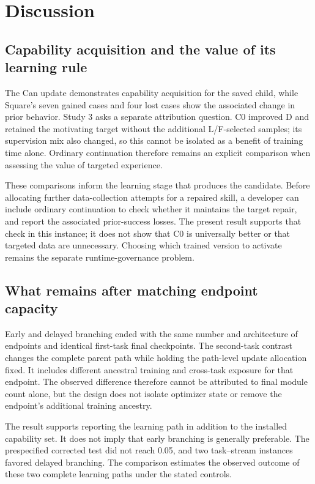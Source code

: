 \documentclass[10pt,letterpaper]{article}
\begin{document}
\section{Discussion}\label{discussion}

\subsection{Capability acquisition and the value of its learning
rule}\label{capability-acquisition-and-the-value-of-its-learning-rule}

The Can update demonstrates capability acquisition for the saved child,
while Square's seven gained cases and four lost cases show the
associated change in prior behavior. Study 3 asks a separate attribution
question. C0 improved D and retained the motivating target without the
additional L/F-selected samples; its supervision mix also changed, so
this cannot be isolated as a benefit of training time alone. Ordinary
continuation therefore remains an explicit comparison when assessing the
value of targeted experience.

These comparisons inform the learning stage that produces the candidate.
Before allocating further data-collection attempts for a repaired skill,
a developer can include ordinary continuation to check whether it
maintains the target repair, and report the associated prior-success
losses. The present result supports that check in this instance; it does
not show that C0 is universally better or that targeted data are
unnecessary. Choosing which trained version to activate remains the
separate runtime-governance problem.

\subsection{What remains after matching endpoint
capacity}\label{what-remains-after-matching-endpoint-capacity}

Early and delayed branching ended with the same number and architecture
of endpoints and identical first-task final checkpoints. The second-task
contrast changes the complete parent path while holding the path-level
update allocation fixed. It includes different ancestral training and
cross-task exposure for that endpoint. The observed difference therefore
cannot be attributed to final module count alone, but the design does
not isolate optimizer state or remove the endpoint's additional training
ancestry.

The result supports reporting the learning path in addition to the
installed capability set. It does not imply that early branching is
generally preferable. The prespecified corrected test did not reach
0.05, and two task--stream instances favored delayed branching. The
comparison estimates the observed outcome of these two complete learning
paths under the stated controls.
\end{document}
